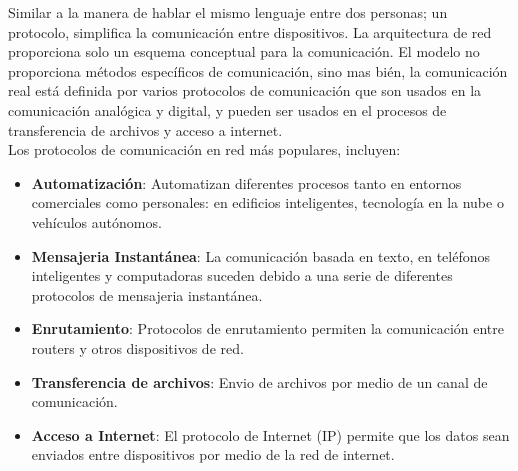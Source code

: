 Similar a la manera de hablar el mismo lenguaje entre dos personas; un protocolo, simplifica la comunicación entre dispositivos. La arquitectura de red proporciona solo un esquema conceptual para la comunicación. El modelo no proporciona métodos específicos de comunicación, sino mas bién, la comunicación real está definida por varios protocolos de comunicación que son usados en la comunicación analógica y digital, y pueden ser usados en el procesos de transferencia de archivos y acceso a internet.\\

Los protocolos de comunicación en red más populares, incluyen:

\begin{itemize}
    \item \textbf{Automatización}: Automatizan diferentes procesos tanto en entornos comerciales como personales: en edificios inteligentes, tecnología en la nube o vehículos autónomos.
    \item \textbf{Mensajeria Instantánea}: La comunicación basada en texto, en teléfonos inteligentes y computadoras suceden debido a una serie de diferentes protocolos de mensajeria instantánea.
    \item \textbf{Enrutamiento}: Protocolos de enrutamiento permiten la comunicación entre routers y otros dispositivos de red.
    \item \textbf{Transferencia de archivos}: Envio de archivos por medio de un canal de comunicación.
    \item \textbf{Acceso a Internet}: El protocolo de Internet (IP) permite que los datos sean enviados entre dispositivos por medio de la red de internet.
\end{itemize}

